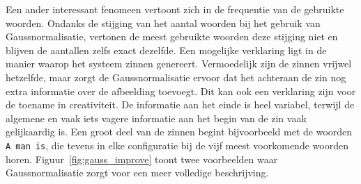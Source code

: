 Een ander interessant fenomeen vertoont zich in de frequentie van de gebruikte woorden. Ondanks de stijging van het aantal woorden bij het gebruik van Gaussnormalisatie, vertonen de meest gebruikte woorden deze stijging niet en blijven de aantallen zelfs exact dezelfde. Een mogelijke verklaring ligt in de manier waarop het systeem zinnen genereert. Vermoedelijk zijn de zinnen vrijwel hetzelfde, maar zorgt de Gaussnormalisatie ervoor dat het achteraan de zin nog extra informatie over de afbeelding toevoegt. Dit kan ook een verklaring zijn voor de toename in creativiteit. De informatie aan het einde is heel variabel, terwijl de algemene en vaak iets vagere informatie aan het begin van de zin vaak gelijkaardig is. Een groot deel van de zinnen begint bijvoorbeeld met de woorden \texttt{A man is}, die tevens in elke configuratie bij de vijf meest voorkomende woorden horen. Figuur~\ref{fig:gauss_improve} toont twee voorbeelden waar Gaussnormalisatie zorgt voor een meer volledige beschrijving.

